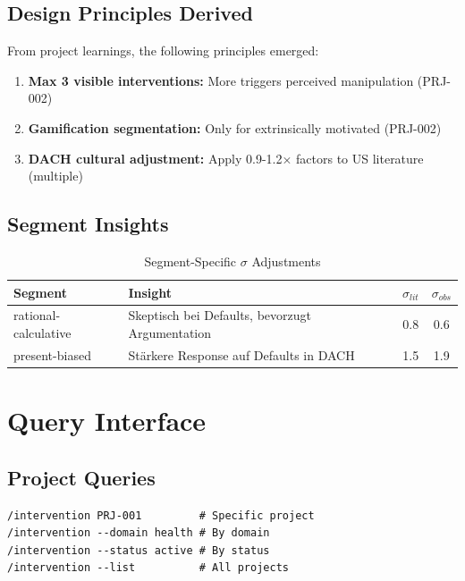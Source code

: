 \subsection{Design Principles Derived}

From project learnings, the following principles emerged:

\begin{enumerate}
    \item \textbf{Max 3 visible interventions:} More triggers perceived manipulation (PRJ-002)
    \item \textbf{Gamification segmentation:} Only for extrinsically motivated (PRJ-002)
    \item \textbf{DACH cultural adjustment:} Apply 0.9-1.2× factors to US literature (multiple)
\end{enumerate}

\subsection{Segment Insights}

\begin{table}[h]
\centering
\begin{tabular}{lp{5cm}cc}
\toprule
\textbf{Segment} & \textbf{Insight} & \textbf{$\sigma_{lit}$} & \textbf{$\sigma_{obs}$} \\
\midrule
rational-calculative & Skeptisch bei Defaults, bevorzugt Argumentation & 0.8 & 0.6 \\
present-biased & Stärkere Response auf Defaults in DACH & 1.5 & 1.9 \\
\bottomrule
\end{tabular}
\caption{Segment-Specific $\sigma$ Adjustments}
\end{table}

\section{Query Interface}

\subsection{Project Queries}

\begin{verbatim}
/intervention PRJ-001         # Specific project
/intervention --domain health # By domain
/intervention --status active # By status
/intervention --list          # All projects
\end{verbatim}

